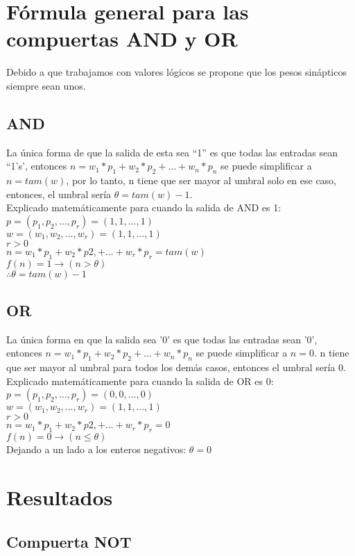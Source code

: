 \documentclass{article}
\begin{document}
\section{Fórmula general para las compuertas AND y OR}
Debido a que trabajamos con valores lógicos se propone que los pesos sinápticos siempre sean unos.
\subsection{AND}
La única forma de que la salida de esta sea ``1'' es que todas las entradas sean ``1's', entonces $n=w_1*p_1 + w_2*p_2 + \ldots + w_n*p_n$ se puede simplificar a $n = tam(w)$, por lo tanto, n tiene que ser mayor al umbral solo en ese caso, entonces, el umbral sería $\theta = tam(w) - 1$.\\
Explicado matemáticamente para cuando la salida de AND es 1:\\
$ p = (p_1, p_2, \ldots, p_r) = (1, 1, \ldots, 1)$\\
$ w = (w_1, w_2, \ldots, w_r) = (1, 1, \ldots, 1)$\\
$ r > 0$\\
$ n = w_1*p_1 + w_2*p2, + \ldots +w_r*p_r = tam(w)$\\
$ f(n) = 1 \rightarrow (n > \theta)$\\
$ \therefore \theta = tam(w) - 1$
\subsection{OR}
La única forma en que la salida sea '0' es que todas las entradas sean '0', entonces $ n=w_1*p_1 + w_2*p_2 + \ldots + w_n*p_n$ se puede simplificar a $ n = 0$. n tiene que ser mayor al umbral para todos los demás casos, entonces el umbral sería 0.\\
Explicado matemáticamente para cuando la salida de OR es 0:\\
$ p = (p_1, p_2, \ldots, p_r) = (0, 0, \ldots, 0)$\\
$ w = (w_1, w_2, \ldots, w_r) = (1, 1, \ldots, 1)$\\
$ r > 0$\\
$ n = w_1*p_1 + w_2*p2, + \ldots +w_r*p_r = 0$\\
$ f(n) = 0 \rightarrow (n \leq \theta)$\\
Dejando a un lado a los enteros negativos: $\theta = 0$
\section{Resultados}
\subsection{Compuerta NOT}
\end{document}
